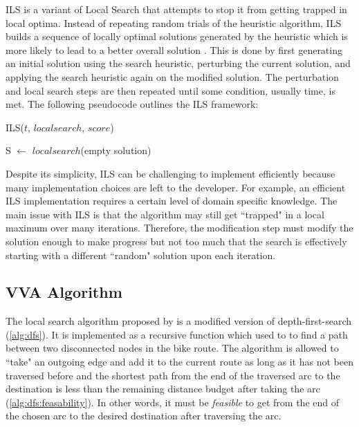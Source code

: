 \documentclass[honors]{union-cs-thesis}
\newcommand{\td}{\todo[inline]}
\begin{document}
ILS is a variant of Local Search that attempts to stop it from getting trapped in local optima. Instead of repeating random trials of the heuristic algorithm, ILS builds a sequence of locally optimal solutions generated by the heuristic which is more likely to lead to a better overall solution \cite{gendreau2010handbook}. This is done by first generating an initial solution using the search heuristic, perturbing the current solution, and applying the search heuristic again on the modified solution. The perturbation and local search steps are then repeated until some condition, usually time, is met.
The following pseudocode outlines the ILS framework:

%
%
\begin{algorithm}
\caption{ILS($t$, $localsearch$, $score$)}
S $\gets$ $localsearch$(empty solution)\;
\end{algorithm}

Despite its simplicity, ILS can be challenging to implement efficiently because many implementation choices are left to the developer. For example, an efficient ILS implementation requires a certain level of domain specific knowledge. The main issue with ILS is that the algorithm may still get ``trapped" in a local maximum over many iterations. Therefore, the modification step must modify the solution enough to make progress but not too much that the search is effectively starting with a different ``random" solution upon each iteration. 



\subsection{VVA Algorithm}
The local search algorithm proposed by \citeauthor{verbeeck2014extension} is a modified version of depth-first-search (\cref{alg:dfs}). It is implemented as a recursive function which used to to find a path between two disconnected nodes in the bike route. The algorithm is allowed to ``take" an outgoing edge and add it to the current route as long as it has not been traversed before and the shortest path from the end of the traversed arc to the destination is less than the remaining distance budget after taking the arc (\cref{alg:dfs:feasability}). In other words, it must be \emph{feasible} to get from the end of the chosen arc to the desired destination after traversing the arc. 
\end{document}
